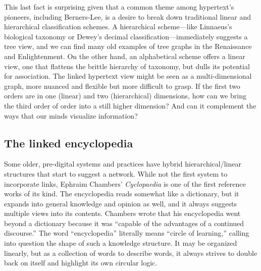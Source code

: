 This last fact is surprising given that a common theme among hypertext's pioneers, including Berners-Lee, is a desire to break down traditional linear and hierarchical classification schemes. A hierarchical scheme---like Linnaeus's biological taxonomy or Dewey's decimal classification---immediately suggests a tree view, and we can find many old examples of tree graphs in the Renaissance and Enlightenment. On the other hand, an alphabetical scheme offers a linear view, one that flattens the brittle hierarchy of taxonomy, but dulls its potential for association. The linked hypertext view might be seen as a multi-dimensional graph, more nuanced and flexible but more difficult to grasp. If the first two orders are in one (linear) and two (hierarchical) dimensions, how can we bring the third order of order into a still higher dimension? And can it complement the ways that our minds visualize information?

\subsection{The linked encyclopedia}

Some older, pre-digital systems and practices have hybrid hierarchical/linear structures that start to suggest a network. While not the first system to incorporate links, Ephraim Chambers' \emph{Cyclopaedia} is one of the first reference works of its kind. The encyclopedia reads somewhat like a dictionary, but it expands into general knowledge and opinion as well, and it always suggests multiple views into its contents. Chambers wrote that his encyclopedia went beyond a dictionary because it was ``capable of the advantages of a continued discourse.''\autocites[i]{chambers_cyclopaedia_1728}[64]{yeo_solution_2003} The word ``encyclopedia'' literally means ``circle of learning,'' calling into question the shape of such a knowledge structure. It may be organized linearly, but as a collection of words to describe words, it always strives to double back on itself and highlight its own circular logic.

